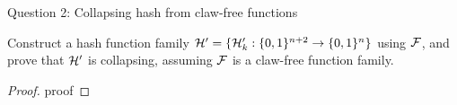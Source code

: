 \begin{solution}{Question 2: Collapsing hash from claw-free functions}\label{ques:x}
    \begin{question}
    Construct a hash function family $ \mathcal{H}' = \{\mathcal{H}'_k : \{0,1\}^{n+2} \rightarrow \{0,1\}^n \} $ using $\mathcal{F}$, and prove that $\mathcal{H}'$ is collapsing, assuming $\mathcal{F}$ is a claw-free function family.

    \end{question}
    \tcblower{}
    \begin{proof}
    proof
    \end{proof}
\end{solution}
